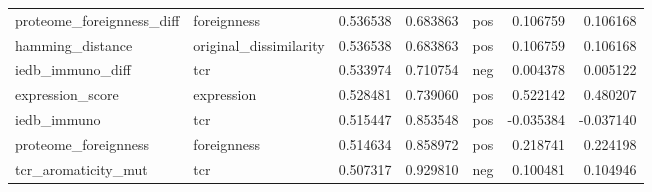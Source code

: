\begin{table}
\begin{tabular}{llrrlrr}
proteome\_foreignness\_diff & foreignness & 0.536538 & 0.683863 & pos & 0.106759 & 0.106168 \\
hamming\_distance & original\_dissimilarity & 0.536538 & 0.683863 & pos & 0.106759 & 0.106168 \\
iedb\_immuno\_diff & tcr & 0.533974 & 0.710754 & neg & 0.004378 & 0.005122 \\
expression\_score & expression & 0.528481 & 0.739060 & pos & 0.522142 & 0.480207 \\
iedb\_immuno & tcr & 0.515447 & 0.853548 & pos & -0.035384 & -0.037140 \\
proteome\_foreignness & foreignness & 0.514634 & 0.858972 & pos & 0.218741 & 0.224198 \\
tcr\_aromaticity\_mut & tcr & 0.507317 & 0.929810 & neg & 0.100481 & 0.104946 \\
\bottomrule
\end{tabular}
\end{table}
